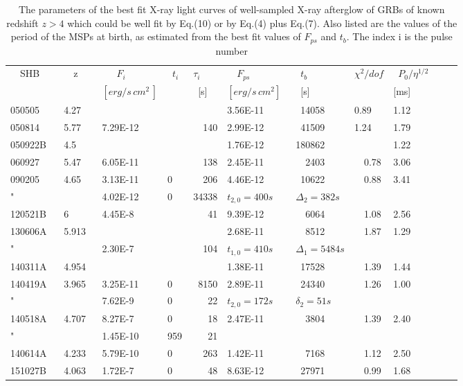 \documentclass[twocolumn]{aastex61}
\begin{document}
\begin{table*}
\caption{The parameters of the best fit
X-ray light curves of well-sampled  X-ray afterglow of
GRBs of known redshift  $z>4$ which could be well fit 
by Eq.(10) or by Eq.(4) plus Eq.(7).  Also
listed are the values of the period  of
the MSPs at birth, as estimated from the best fit values of
$F_{ps}$ and $t_b$. The index i is the pulse number}
\centering

\begin{tabular}{l l l l l l l l l l l}
\hline
\hline
~~SHB~~~&~~z~~~&~~~$F_i$~~~~&~$t_i$~&$\tau_i$~~&~~$F_{ps}$~~&~$t_b$&$\chi^2/dof$&~$P_0/\eta^{1/2}$~\\
        &     &$[erg/s\,cm^2\,]$&        &   ~[s]~  &$[erg/s\,cm^2]$~& ~[s]~& & [ms]\\
\hline

050505~ & 4.27~  &           &   &        & 3.56E-11 & ~14058~& 0.89 & 1.12 \\

050814~ & 5.77~  & 7.29E-12  &   & ~~140  & 2.99E-12 & ~41509~& 1.24  & 1.79 \\

050922B & 4.5~~  &           &   &        & 1.76E-12 & 180862~&       & 1.22 \\

060927~ & 5.47~  &  6.05E-11 &   & ~~138  & 2.45E-11 & ~~2403&~~0.78 & 3.06 \\

090205~ & 4.65   &  3.13E-11 & 0 & ~~206  & 4.46E-12 & ~10622&~~0.88 & 3.41 \\
   "     &        &  4.02E-12 & 0 & 34338  &$t_{2,0}=400s$&$\Delta_2=382s$&& \\

120521B & 6~~~~  &  4.45E-8  &   & ~~~41  & 9.39E-12 & ~~6064&~~1.08 & 2.56 \\

130606A & 5.913~ &           &   &        & 2.68E-11 & ~~8512&~~1.87 & 1.29 \\
  "     &        &  2.30E-7~ &   & ~~104  &$t_{1,0}=410s$&$\Delta_1=5484s$&& \\

140311A & 4.954~ &           &   &        & 1.38E-11 & ~17528&~~1.39 & 1.44 \\

140419A & 3.965~ &  3.25E-11 & 0 & ~8150  & 2.89E-11 & ~24340&~~1.26 & 1.00 \\
   "     &        &  7.62E-9~ & 0 & ~~~22  & $t_{2,0}=172s$& $\delta_2=51s$&&\\

140518A & 4.707~ &  8.27E-7~ & 0 & ~~~18  & 2.47E-11 & ~~3804&~~1.39 & 2.40 \\
    "   &        &  1.45E-10 &959& ~~~21  &          &       &       &      \\


140614A & 4.233~ &  5.79E-10 & 0 & ~~263  & 1.42E-11 & ~~7168&~~1.12 & 2.50 \\

151027B & 4.063  &  1.72E-7~ & 0 & ~~~48  & 8.63E-12 & ~27971&~~0.99 & 1.68 \\
\hline

\end{tabular}
\end{table*}
\end{document}
